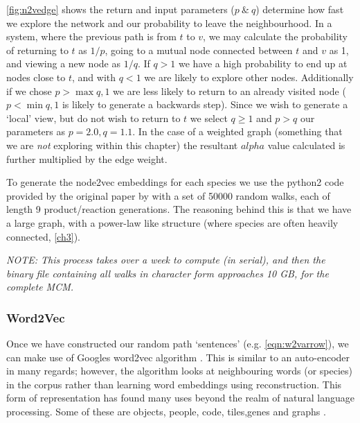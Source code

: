  \autoref{fig:n2vedge} shows the return and input parameters ($p\ \&\ q$) determine how fast we explore the network and our probability to leave the neighbourhood. In a system, where the previous path is from $t$ to $v$, we may calculate the probability of returning to $t$ as $1/p$, going to a mutual node connected between $t$ and $v$ as 1, and viewing a new node as $1/q$.
If $q>1$ we have a high probability to end up at nodes close to $t$, and with $q<1$ we are likely to explore other nodes. Additionally if we chose $p> \max{q,1}$ we are less likely to return to an already visited node ($p < \min{q,1}$ is likely to generate a backwards step). Since we wish to generate a `local' view, but do not wish to return to $t$ we select  $q \ge 1$ and $p > q$ our parameters as  $p = 2.0,q=1.1$.  In the case of a weighted graph (something that we are \textit{not} exploring within this chapter) the resultant $alpha$ value calculated is further multiplied by the edge weight.

To generate the node2vec embeddings for each species we use the python2 code provided by the original paper by \cite{node2vec} with a set of 50000 random walks, each of length 9 product/reaction generations. The reasoning behind this is that we have a large graph, with a power-law like structure (where species are often heavily connected, \autoref{ch3}).

\textit{NOTE: This process takes over a week to compute (in serial), and then the binary file containing all walks in character form approaches 10 GB, for the complete MCM. }




\subsubsection{Word2Vec}\label{sec:w2v}
Once we have constructed our random path `sentences' (e.g. \autoref{eqn:w2varrow}), we can make use of Googles word2vec algorithm \citep{w2v}. This is similar to an auto-encoder in many regards; however, the algorithm looks at neighbouring words (or species) in the corpus rather than learning word embeddings using reconstruction. This form of representation has found many uses beyond the realm of natural language processing. Some of these are objects, people, code, tiles,genes and graphs \citep{objects,people,code,tile,gene,graph2vec}.


%
%

